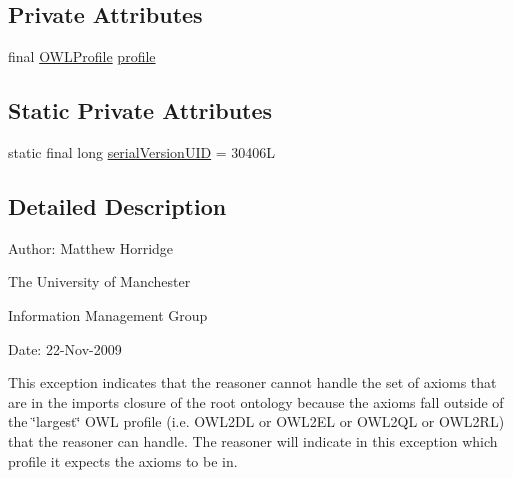 \subsection*{Private Attributes}
\begin{DoxyCompactItemize}
\item 
final \hyperlink{interfaceorg_1_1semanticweb_1_1owlapi_1_1profiles_1_1_o_w_l_profile}{O\-W\-L\-Profile} \hyperlink{classorg_1_1semanticweb_1_1owlapi_1_1reasoner_1_1_imports_closure_not_in_profile_exception_ab85e99cbbda0c387ab5ec4d853079f71}{profile}
\end{DoxyCompactItemize}
\subsection*{Static Private Attributes}
\begin{DoxyCompactItemize}
\item 
static final long \hyperlink{classorg_1_1semanticweb_1_1owlapi_1_1reasoner_1_1_imports_closure_not_in_profile_exception_a60388bb0a68c42ecdd54ac77cb45f18b}{serial\-Version\-U\-I\-D} = 30406\-L
\end{DoxyCompactItemize}


\subsection{Detailed Description}
Author\-: Matthew Horridge\par
 The University of Manchester\par
 Information Management Group\par
 Date\-: 22-\/\-Nov-\/2009 

This exception indicates that the reasoner cannot handle the set of axioms that are in the imports closure of the root ontology because the axioms fall outside of the \char`\"{}largest\char`\"{} O\-W\-L profile (i.\-e. O\-W\-L2\-D\-L or O\-W\-L2\-E\-L or O\-W\-L2\-Q\-L or O\-W\-L2\-R\-L) that the reasoner can handle. The reasoner will indicate in this exception which profile it expects the axioms to be in. 

